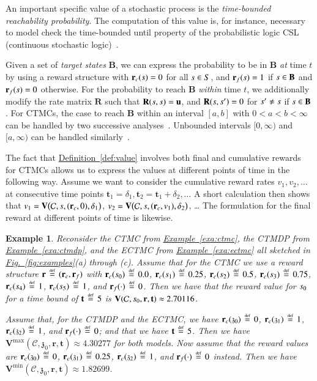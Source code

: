 \documentclass[10pt,twocolumn]{article}
\newtheorem{example}{Example}
\newcommand{\states} {{\ensuremath S}}
\newcommand{\state}  {{\ensuremath s}}
\newcommand{\rmat}{\mathbf{R}}
\newcommand{\cmodel}{\mathcal{C}}
\newcommand{\urate}{\mathbf{u}}
\newcommand{\rew}{\mathbf{r}}
\newcommand{\frew}{\mathbf{r}_f}
\newcommand{\crew}{\mathbf{r}_c}
\newcommand{\target}{\mathbf{B}}
\newcommand{\timeb}{\mathbf{t}}
\newcommand{\mvalue}{\mathbf{V}}
\newcommand{\astate}{\mathfrak{z}}
\newcommand{\refdef}[1]{\texorpdfstring{\hyperref[def:#1]{Definition~\ref*{def:#1}}}{Definition \ref*{def:#1}}}
\newcommand{\reffig}[1]{\texorpdfstring{\hyperref[fig:#1]{Fig.~\ref*{fig:#1}}}{Fig.~\ref*{fig:#1}}}
\newcommand{\refexa}[1]{\texorpdfstring{\hyperref[exa:#1]{Example~\ref*{exa:#1}}}{Example~\ref*{exa:#1}}}
\newcommand{\defeq}{\,\stackrel{\mbox{\rm {\tiny def}}}{=}\,}
\begin{document}
An important specific value of a stochastic process is
the \emph{time-bounded reachability probability}. The computation
of this value is, for instance, necessary to model check the
time-bounded until property of the probabilistic logic CSL
(continuous stochastic logic)~\cite{BaierHHK03}.

Given a set of \emph{target states} $\target$, we can express the probability
to be in $\target$ \emph{at} time $t$ by using a reward structure with $\crew(\state) = 0$
for all $\state \in \states$, and $\frew(\state) = 1$ if $\state \in \target$
and $\frew(\state) = 0$ otherwise. For the probability to reach $\target$ \emph{within}
time $t$, we additionally modify the rate matrix $\rmat$ such that $\rmat(\state, \state) = \urate$,
and $\rmat(\state, \state') = 0$ for $\state' \neq \state$ if $\state \in \target$.
For CTMCs, the case to reach $\target$ within an interval $[a,b]$ with $0 < a < b < \infty$ can
be handled by two successive analyses~\cite[Theorem 3]{BaierHHK03}. Unbounded intervals
$[0,\infty)$ and $[a,\infty)$ can be handled similarly~\cite[Section 4.4]{KwiatkowskaNP07}.

The fact that \refdef{value} involves both final and cumulative rewards for CTMCs allows us to express the values at different points of time in the following way.
Assume we want to consider the cumulative reward rates $v_1, v_2, \ldots$ at consecutive time points $\timeb_1 = \delta_1, \timeb_2 = \timeb_1 + \delta_2, \ldots$
A short calculation then shows that $v_1 = \mvalue\bigl(\cmodel, \state, (\crew, 0), \delta_1\bigr)$, $v_2 = \mvalue\bigl(\cmodel, \state, (\crew, v_1), \delta_2\bigr)$, \dots{}
The formulation for the final reward at different points of time is likewise.

\begin{example}
  \label{exa:values}
Reconsider the CTMC from \refexa{ctmc}, the CTMDP from \refexa{ctmdp}, and the ECTMC from \refexa{ectmc} all sketched in \reffig{examples}(a) through (c).
  Assume that for the CTMC we use a reward structure $\rew \defeq (\crew, \frew)$ with
  $\crew(\state_0) \defeq 0.0$, $\crew(\state_1) \defeq 0.25$, $\crew(\state_2) \defeq 0.5$, $\crew(\state_3) \defeq 0.75$, $\crew(\state_4) \defeq 1$,
  $\crew(\state_5) \defeq 1$, and $\frew(\cdot) \defeq 0$.
  Then we have that the reward value for $\state_0$ for a time bound of $\timeb \defeq 5$ is $\mvalue(\cmodel, \state_0, \rew, \timeb) \approx 2.70116$.

  Assume that, for the CTMDP and the ECTMC, we have $\crew(\astate_0) \defeq 0$, $\crew(\astate_1) \defeq 1$, $\crew(\astate_2) \defeq 1$, and $\frew(\cdot) \defeq 0$;
  and that we have $\timeb \defeq 5$. Then we have $\mvalue^{\max}(\cmodel, \astate_0, \rew, \timeb) \approx 4.30277$ for both models.
  Now assume that the reward values are $\crew(\astate_0) \defeq 0$, $\crew(\astate_1) \defeq 0.25$, $\crew(\astate_2) \defeq 1$, and $\frew(\cdot) \defeq 0$ instead.
  Then we have $\mvalue^{\min}(\cmodel, \astate_0, \rew, \timeb) \approx 1.82699$.
\end{example}
\end{document}
